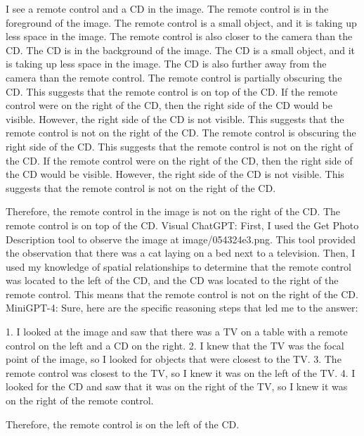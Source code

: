 \begin{enumerate}
    I see a remote control and a CD in the image.
    The remote control is in the foreground of the image. The remote control is a small object, and it is taking up less space in the image. The remote control is also closer to the camera than the CD.
    The CD is in the background of the image. The CD is a small object, and it is taking up less space in the image. The CD is also further away from the camera than the remote control.
    The remote control is partially obscuring the CD. This suggests that the remote control is on top of the CD.
    If the remote control were on the right of the CD, then the right side of the CD would be visible. However, the right side of the CD is not visible. This suggests that the remote control is not on the right of the CD.
    The remote control is obscuring the right side of the CD. This suggests that the remote control is not on the right of the CD. If the remote control were on the right of the CD, then the right side of the CD would be visible. However, the right side of the CD is not visible. This suggests that the remote control is not on the right of the CD.
    
    Therefore, the remote control in the image is not on the right of the CD. The remote control is on top of the CD.
    \subitem Visual ChatGPT: First, I used the Get Photo Description tool to observe the image at image/054324e3.png. This tool provided the observation that there was a cat laying on a bed next to a television. Then, I used my knowledge of spatial relationships to determine that the remote control was located to the left of the CD, and the CD was located to the right of the remote control. This means that the remote control is not on the right of the CD.
    \subitem MiniGPT-4: Sure, here are the specific reasoning steps that led me to the answer:

    1. I looked at the image and saw that there was a TV on a table with a remote control on the left and a CD on the right.
    2. I knew that the TV was the focal point of the image, so I looked for objects that were closest to the TV.
    3. The remote control was closest to the TV, so I knew it was on the left of the TV.
    4. I looked for the CD and saw that it was on the right of the TV, so I knew it was on the right of the remote control.
    
    Therefore, the remote control is on the left of the CD.
\end{enumerate}
